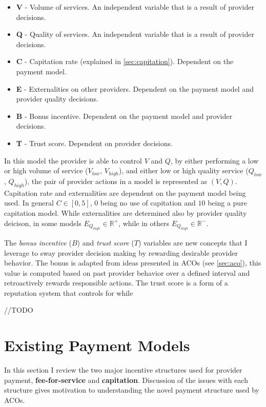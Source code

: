 \documentclass{article}
\begin{document}
\begin{itemize}
    \item \textbf{V} - Volume of services. An independent variable that is a result of provider decisions.
    \item \textbf{Q} - Quality of services. An independent variable that is a result of provider decisions.
    \item \textbf{C} - Capitation rate (explained in \ref{sec:capitation}). Dependent on the payment model.
    \item \textbf{E} - Externalities on other providers. Dependent on the payment model and provider quality decisions.
    \item \textbf{B} - Bonus incentive. Dependent on the payment model and provider decisions.
    \item \textbf{T} - Trust score. Dependent on provider decisions.
\end{itemize}

In this model the provider is able to control $V$ and $Q$, by either performing a low or high volume of service ($V_{low}$, $V_{high}$), and either low or high quality service ($Q_{low}$, $Q_{high}$), the pair of provider actions in a model is represented as $(V, Q)$. Capitation rate and externalities are dependent on the payment model being used. In general $C \in [0, 5]$, $0$ being no use of capitation and $10$ being a pure capitation model. While externalities are determined also by provider quality deicison, in some models $E_{Q_{high}} \in \mathbb{R}^+$, while in others $E_{Q_{high}} \in \mathbb{R}^-$.

The \emph{bonus incentive} ($B$) and \emph{trust score} ($T$) variables are new concepts that I leverage to sway provider decision making by rewarding desirable provider behavior. The bonus is adapted from ideas presented in ACOs (see \ref{sec:aco}), this value is computed based on past provider behavior over a defined interval and retroactively rewards responsible actions. The trust score is a form of a reputation system \cite{tim} that controls for while 

//TODO

\section{Existing Payment Models}
In this section I review the two major incentive structures used for provider payment, \textbf{fee-for-service} and \textbf{capitation}. Discussion of the issues with each structure gives motivation to understanding the novel payment structure used by ACOs.
\end{document}
